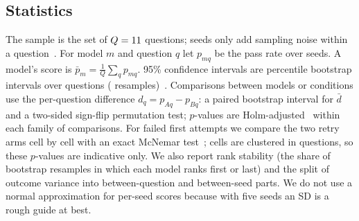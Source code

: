 \subsection{Statistics}
\label{sec:stats}
The sample is the set of $Q=11{}$ questions; seeds only add sampling noise within a question~\citep{miller2024errorbars}. For model $m$ and question $q$ let $p_{mq}$ be the pass rate over seeds. A model's score is $\bar p_m=\frac1Q\sum_q p_{mq}$.
95\% confidence intervals are percentile bootstrap intervals over questions (\nboot{} resamples)~\citep{efron1993bootstrap}. Comparisons between models or conditions use the per-question difference $d_q=p_{Aq}-p_{Bq}$: a paired bootstrap interval for $\bar d$ and a two-sided sign-flip
permutation test; $p$-values are Holm-adjusted~\citep{holm1979} within each family of comparisons. For failed first attempts we compare the two retry arms cell by cell with an exact McNemar test~\citep{mcnemar1947}; cells are clustered in questions, so these $p$-values are indicative only. We also report
rank stability (the share of bootstrap resamples in which each model ranks first or last) and the split of outcome variance into between-question and between-seed parts. We do not use a normal approximation for per-seed scores because with five seeds an SD is a rough guide at best.
